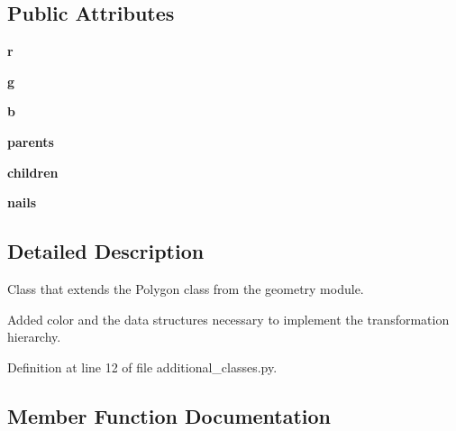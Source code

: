\subsection*{Public Attributes}
\begin{DoxyCompactItemize}
\item 
\mbox{\label{classadditional__classes_1_1ColoredPolygon_a295d9e1070e4d575743c49de93445682}} 
{\bfseries r}
\item 
\mbox{\label{classadditional__classes_1_1ColoredPolygon_ac2746b0396a46ec9effcc8f90d565e71}} 
{\bfseries g}
\item 
\mbox{\label{classadditional__classes_1_1ColoredPolygon_aba7d007dc6febd0340a7097f7aca3cc4}} 
{\bfseries b}
\item 
\mbox{\label{classadditional__classes_1_1ColoredPolygon_ae98eb7632de780c284f816bbe61048f0}} 
{\bfseries parents}
\item 
\mbox{\label{classadditional__classes_1_1ColoredPolygon_ae3cfb699daba9fbf0ecb216844e0c62b}} 
{\bfseries children}
\item 
\mbox{\label{classadditional__classes_1_1ColoredPolygon_a2a6a05cb4c03964b8a6ca44aa5fe286d}} 
{\bfseries nails}
\end{DoxyCompactItemize}


\subsection{Detailed Description}
Class that extends the Polygon class from the geometry module. 

Added color and the data structures necessary to implement the transformation hierarchy. 

Definition at line 12 of file additional\+\_\+classes.\+py.



\subsection{Member Function Documentation}
\mbox{\label{classadditional__classes_1_1ColoredPolygon_a3ba3e35b383cc6999480057a4d026e71}} 
